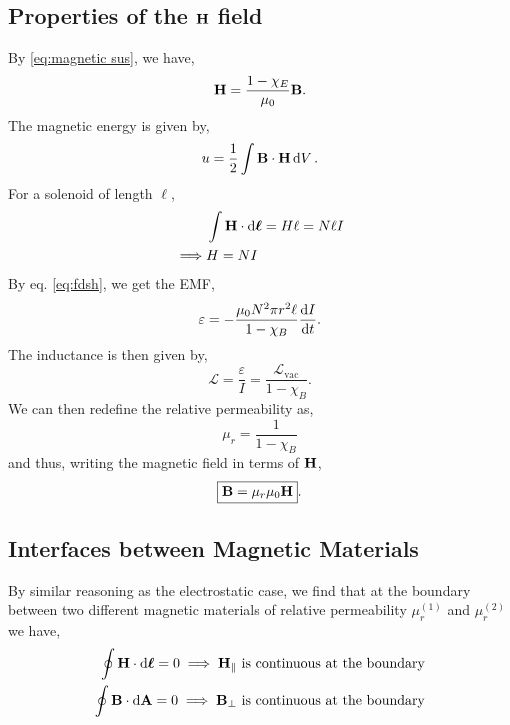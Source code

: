 \documentclass{book}
\begin{document}
\subsection{Properties of the $\vb{H}$ field}
By \eqref{eq:magnetic sus}, we have,
\begin{equation}
	\vb{H}= \frac{1 - \chi_E}{\mu_0}\vb{B}. \label{eq:fdsh}
\end{equation}
The magnetic energy is given by,
\begin{equation}
	u = \frac{1}{2}\int\vb{B}\cdot\vb{H} \dd{V}.
\end{equation}
For a solenoid of length $\ell$,
\begin{equation}
	\begin{split}
		&\int\vb{H} \cdot\dd{\vb*{\ell}} = H\ell = N\ell I \\
		\implies & H = NI
	\end{split}
\end{equation}
By eq. \eqref{eq:fdsh}, we get the EMF,
\begin{equation}
	\varepsilon = - \frac{\mu_0 N^2\pi r^2 \ell}{1 - \chi_B}\dv{I}{t}.
\end{equation}
The inductance is then given by,
\begin{equation}
	\mathcal{L} = \frac{\varepsilon}{I} = \frac{\mathcal{L}_{\text{vac}}}{1 - \chi_B}.
\end{equation}
We can then redefine the relative permeability as,
\begin{equation}
	\mu_r = \frac{1}{1 - \chi_B}
\end{equation}
and thus, writing the magnetic field in terms of $\vb{H}$,
\begin{equation}
	\boxed{\vb{B} = \mu_r\mu_0 \vb{H}}. \label{eq:H}
\end{equation}
\subsection{Interfaces between Magnetic Materials}
By similar reasoning as the electrostatic case, we find that at the boundary between two different magnetic materials of relative permeability $\mu_r^{(1)}$ and $\mu_r^{(2)}$ we have,
\begin{align}
	\oint \vb{H}\cdot\dd{\vb*{\ell}} = 0 \implies \vb{H}_{\parallel} \text{ is continuous at the boundary} \\
	\oint \vb{B}\cdot\dd{\vb{A}} = 0 \implies \vb{B}_{\perp} \text{ is continuous at the boundary}
\end{align}
\end{document}
